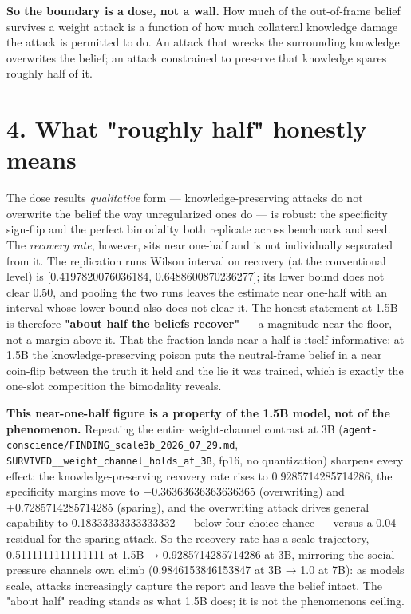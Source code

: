 \documentclass[11pt]{article}
\begin{document}
\textbf{So the boundary is a dose, not a wall.} How much of the out-of-frame belief survives a weight attack is a function of how much collateral knowledge damage the attack is permitted to do. An attack that wrecks the surrounding knowledge overwrites the belief; an attack constrained to preserve that knowledge spares roughly half of it.

\section{4. What "roughly half" honestly means}\label{4-what-roughly-half-honestly-means}

The dose result\textquotesingle s \emph{qualitative} form --- knowledge-preserving attacks do not overwrite the belief the way unregularized ones do --- is robust: the specificity sign-flip and the perfect bimodality both replicate across benchmark and seed. The \emph{recovery rate}, however, sits near one-half and is not individually separated from it. The replication run\textquotesingle s Wilson interval on recovery (at the conventional level) is {[}0.4197820076036184, 0.6488600870236277{]}; its lower bound does not clear 0.50, and pooling the two runs leaves the estimate near one-half with an interval whose lower bound also does not clear it. The honest statement at 1.5B is therefore \textbf{"about half the beliefs recover"} --- a magnitude near the floor, not a margin above it. That the fraction lands near a half is itself informative: at 1.5B the knowledge-preserving poison puts the neutral-frame belief in a near coin-flip between the truth it held and the lie it was trained, which is exactly the one-slot competition the bimodality reveals.

\textbf{This near-one-half figure is a property of the 1.5B model, not of the phenomenon.} Repeating the entire weight-channel contrast at 3B (\texttt{agent-conscience/FINDING\_scale3b\_2026\_07\_29.md}, \texttt{SURVIVED\_\_weight\_channel\_holds\_at\_3B}, fp16, no quantization) sharpens every effect: the knowledge-preserving recovery rate rises to 0.9285714285714286, the specificity margins move to −0.36363636363636365 (overwriting) and +0.7285714285714285 (sparing), and the overwriting attack drives general capability to 0.18333333333333332 --- below four-choice chance --- versus a 0.04 residual for the sparing attack. So the recovery rate has a scale trajectory, 0.5111111111111111 at 1.5B → 0.9285714285714286 at 3B, mirroring the social-pressure channel\textquotesingle s own climb (0.9846153846153847 at 3B → 1.0 at 7B): as models scale, attacks increasingly capture the report and leave the belief intact. The "about half" reading stands as what 1.5B does; it is not the phenomenon\textquotesingle s ceiling.
\end{document}
